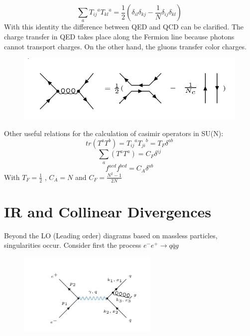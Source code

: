 \begin{equation}
\displaystyle\sum\limits_{a} {T_{ij}}^a {T_{kl}}^a = \frac{1}{2}(\delta_{il}\delta_{kj}-\frac{1}{N}\delta_{ij}\delta_{kl})
\label{Fierz}
\end{equation}
With this identity the difference between QED and QCD can be clarified. The charge transfer in QED takes place along the Fermion line because photons cannot transport charges. On the other hand, the gluons transfer color charges. 
\begin{figure}[h!]
\centering
\includegraphics[scale=0.6]{images/Intro/Fritz.png}
\end{figure}
 

Other useful relations for the calculation of casimir operators in SU(N):
\begin{equation}
tr(T^a T^b)= {T_{ij}}^a {T_{ji}}^b = T_F \delta^{ab}
\end{equation}
\begin{equation}
\displaystyle\sum\limits_{a} (T^a T^a) = C_F \delta^{ij}
\end{equation}
\begin{equation}
f^{acd} f^{bcd} = C_A \delta^{ab}
\end{equation}
With $  T_F = \frac{1}{2} $ , $ C_A = N $ and $ C_F = \frac{N^2 -1}{2N} $
\pagebreak
\section{IR and Collinear Divergences}
\label{ir}
Beyond the LO (Leading order) diagrams based on massless particles, singularities occur. Consider first the process $ e^- e^+ \rightarrow q\bar{q}g $

\begin{figure}[ht!]
\centering
\includegraphics[width=0.6\textwidth]{images/Intro/IRCol.png}
\end{figure}

